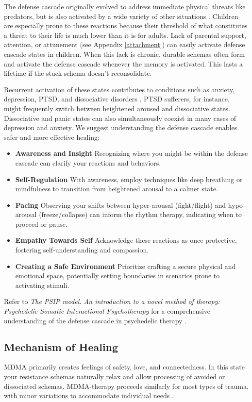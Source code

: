 \documentclass[12pt,letterpaper]{article}
\begin{document}
The defense cascade originally evolved to address immediate physical threats like predators, but is also activated by a wide variety of other situations \cite{razviPSIP}. Children are especially prone to these reactions because their threshold of what constitutes a threat to their life is much lower than it is for adults. Lack of parental support, attention, or attunement (see Appendix \ref{attachment}) can easily activate defense cascade states in children. When this lack is chronic, durable schemas often form and activate the defense cascade whenever the memory is activated. This lasts a lifetime if the stuck schema doesn't reconsolidate.

Recurrent activation of these states contributes to conditions such as anxiety, depression, PTSD, and dissociative disorders \cite{razviPSIP}. PTSD sufferers, for instance, might frequently switch between heightened aroused and dissociative states. Dissociative and panic states can also simultaneously coexist in many cases of depression and anxiety. We suggest understanding the defense cascade enables safer and more effective healing:
\begin{itemize}
    \item \textbf{Awareness and Insight} Recognizing where you might be within the defense cascade can clarify your reactions and behaviors.
    \item \textbf{Self-Regulation} With awareness, employ techniques like deep breathing or mindfulness to transition from heightened arousal to a calmer state.
    \item \textbf{Pacing} Observing your shifts between hyper-arousal (fight/flight) and hypo-arousal (freeze/collapse) can inform the rhythm therapy, indicating when to proceed or pause. 
    \item \textbf{Empathy Towards Self} Acknowledge these reactions as once protective, fostering self-understanding and compassion.
    \item \textbf{Creating a Safe Environment} Prioritize crafting a secure physical and emotional space, potentially setting boundaries in scenarios prone to activating stimuli.
\end{itemize}

Refer to \textit{The PSIP model. An introduction to a novel method of therapy: Psychedelic Somatic Interactional Psychotherapy} for a comprehensive understanding of the defense cascade in psychedelic therapy \cite{razviPSIP}.
\subsection{Mechanism of Healing}
MDMA primarily creates feelings of safety, love, and connectedness. In this state your resistance schemas naturally relax and allow processing of avoided or dissociated schemas. MDMA-therapy proceeds similarly for most types of trauma, with minor variations to accommodate individual needs \cite{otaloraMDMA}.
\end{document}
